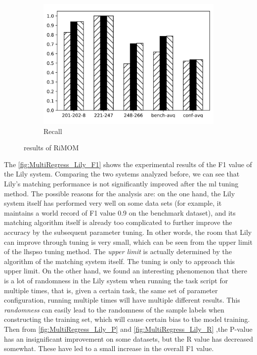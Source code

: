 \documentclass[twoside]{article}
\begin{document}
\begin{figure}[htb!]
\begin{subfigure}{0.3\textwidth}
\label{fig:MultiRegress_RiMOM_P}
\end{subfigure}
\begin{subfigure}{0.3\textwidth}
	\centering
\includegraphics[width=\textwidth]{data_figs/MulRegress_RiMOM_R.pdf}
\caption{Recall}
\label{fig:MultiRegress_RiMOM_R}
\end{subfigure}
\caption{results of RiMOM}
\end{figure}

The \ref{fig:MultiRegress_Lily_F1} shows the experimental results of the F1 value of the Lily system.
Comparing the two systems analyzed before, we can see that Lily's matching performance is not significantly improved after the ml tuning method.
The possible reasons for the analysis are: on the one hand, the Lily system itself has performed very well on some data sets (for example, it maintains a world record of F1 value 0.9 on the benchmark dataset), and its matching algorithm itself is already too complicated to further improve the accuracy by the subsequent parameter tuning.
In other words, the room that Lily can improve through tuning is very small, which can be seen from the upper limit of the lhspso tuning method.
The {\it upper limit} is actually determined by the algorithm of the matching system itself. The tuning is only to approach this upper limit. On the other hand, we found an interesting phenomenon that there is a lot of randomness in the Lily system when running the task script for multiple times, that is, given a certain task, the same set of parameter configuration, running multiple times will have multiple different results.
This {\it randomness} can easily lead to the randomness of the sample labels when constructing the training set, which will cause certain bias to the model training.
Then from \ref{fig:MultiRegress_Lily_P} and \ref{fig:MultiRegress_Lily_R} ,the P-value has an insignificant improvement on some datasets, but the R value has decreased somewhat. These have led to a small increase in the overall F1 value.
\end{document}
